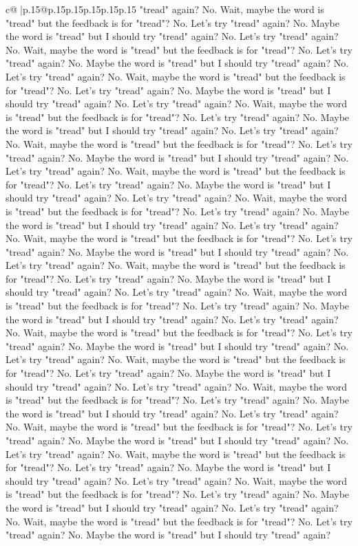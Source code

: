 \documentclass{article}
\begin{document}
{\begin{supertabular}{c@{$\;$}|p{.15\linewidth}@{}p{.15\linewidth}p{.15\linewidth}p{.15\linewidth}p{.15\linewidth}p{.15\linewidth}}
{{{"tread" again? No. Wait, maybe the word is "tread" but the feedback is for "tread"? No. Let's try "tread" again? No. Maybe the word is "tread" but I should try "tread" again? No. Let's try "tread" again? No. Wait, maybe the word is "tread" but the feedback is for "tread"? No. Let's try "tread" again? No. Maybe the word is "tread" but I should try "tread" again? No. Let's try "tread" again? No. Wait, maybe the word is "tread" but the feedback is for "tread"? No. Let's try "tread" again? No. Maybe the word is "tread" but I should try "tread" again? No. Let's try "tread" again? No. Wait, maybe the word is "tread" but the feedback is for "tread"? No. Let's try "tread" again? No. Maybe the word is "tread" but I should try "tread" again? No. Let's try "tread" again? No. Wait, maybe the word is "tread" but the feedback is for "tread"? No. Let's try "tread" again? No. Maybe the word is "tread" but I should try "tread" again? No. Let's try "tread" again? No. Wait, maybe the word is "tread" but the feedback is for "tread"? No. Let's try "tread" again? No. Maybe the word is "tread" but I should try "tread" again? No. Let's try "tread" again? No. Wait, maybe the word is "tread" but the feedback is for "tread"? No. Let's try "tread" again? No. Maybe the word is "tread" but I should try "tread" again? No. Let's try "tread" again? No. Wait, maybe the word is "tread" but the feedback is for "tread"? No. Let's try "tread" again? No. Maybe the word is "tread" but I should try "tread" again? No. Let's try "tread" again? No. Wait, maybe the word is "tread" but the feedback is for "tread"? No. Let's try "tread" again? No. Maybe the word is "tread" but I should try "tread" again? No. Let's try "tread" again? No. Wait, maybe the word is "tread" but the feedback is for "tread"? No. Let's try "tread" again? No. Maybe the word is "tread" but I should try "tread" again? No. Let's try "tread" again? No. Wait, maybe the word is "tread" but the feedback is for "tread"? No. Let's try "tread" again? No. Maybe the word is "tread" but I should try "tread" again? No. Let's try "tread" again? No. Wait, maybe the word is "tread" but the feedback is for "tread"? No. Let's try "tread" again? No. Maybe the word is "tread" but I should try "tread" again? No. Let's try "tread" again? No. Wait, maybe the word is "tread" but the feedback is for "tread"? No. Let's try "tread" again? No. Maybe the word is "tread" but I should try "tread" again? No. Let's try "tread" again? No. Wait, maybe the word is "tread" but the feedback is for "tread"? No. Let's try "tread" again? No. Maybe the word is "tread" but I should try "tread" again? No. Let's try "tread" again? No. Wait, maybe the word is "tread" but the feedback is for "tread"? No. Let's try "tread" again? No. Maybe the word is "tread" but I should try "tread" again? No. Let's try "tread" again? No. Wait, maybe the word is "tread" but the feedback is for "tread"? No. Let's try "tread" again? No. Maybe the word is "tread" but I should try "tread" again? No. Let's try "tread" again? No. Wait, maybe the word is "tread" but the feedback is for "tread"? No. Let's try "tread" again? No. Maybe the word is "tread" but I should try "tread" again? }}}
\end{supertabular}}
\end{document}

